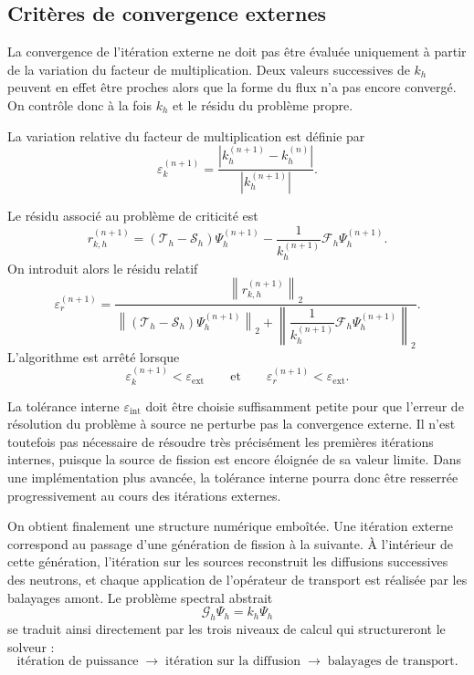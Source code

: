 \documentclass{article}
\begin{document}
\subsection {Critères de convergence externes}

La convergence de l'itération externe ne doit pas être évaluée uniquement à partir de la variation du facteur de multiplication. Deux valeurs successives de $k_h$ peuvent en effet être proches alors que la forme du flux n'a pas encore convergé. On contrôle donc à la fois $k_h$ et le résidu du problème propre.

La variation relative du facteur de multiplication est définie par
\begin{equation}
    \varepsilon_k^{(n+1)} =
    \frac{\left| k_h^{(n+1)}-k_h^{(n)} \right|}
    {\left|k_h^{(n+1)}\right|}.
    \label{eq:critere-keff-transport}
\end{equation}

Le résidu associé au problème de criticité est
\begin{equation}
    r_{k,h}^{(n+1)} = \left( \mathcal T_h-\mathcal S_h \right) \Psi_h^{(n+1)}
    - \frac{1}{k_h^{(n+1)}} \mathcal F_h\Psi_h^{(n+1)}.
    \label{eq:residu-criticite-transport}
\end{equation}
On introduit alors le résidu relatif
\begin{equation}
    \varepsilon_r^{(n+1)}
    = \frac{\left\| r_{k,h}^{(n+1)} \right\|_2}
    {\left\|
        \left( \mathcal T_h-\mathcal S_h \right) \Psi_h^{(n+1)} \right\|_2
        + \left\| \dfrac{1}{k_h^{(n+1)}} \mathcal F_h\Psi_h^{(n+1)} \right\|_2}.
    \label{eq:critere-residu-transport}
\end{equation}
L'algorithme est arrêté lorsque
\begin{equation}
    \boxed{
        \varepsilon_k^{(n+1)} < \varepsilon_{\mathrm{ext}}
        \qquad\text{et}\qquad
        \varepsilon_r^{(n+1)} < \varepsilon_{\mathrm{ext}}.
    }
    \label{eq:arret-criticite-transport}
\end{equation}

La tolérance interne $\varepsilon_{\mathrm{int}}$ doit être choisie suffisamment petite pour que l'erreur de résolution du problème à source ne perturbe pas la convergence externe. Il n'est toutefois pas nécessaire de résoudre très précisément les premières itérations internes, puisque la source de fission est encore éloignée de sa valeur limite. Dans une implémentation plus avancée, la tolérance interne pourra donc être resserrée progressivement au cours des itérations externes.

On obtient finalement une structure numérique emboîtée. Une itération externe correspond au passage d'une génération de fission à la suivante. À l'intérieur de cette génération, l'itération sur les
sources reconstruit les diffusions successives des neutrons, et chaque application de l'opérateur de transport est réalisée par les balayages amont. Le problème spectral abstrait
\[
    \mathcal G_h\Psi_h=k_h\Psi_h
\]
se traduit ainsi directement par les trois niveaux de calcul qui structureront le solveur :
\[
    \boxed{
        \text{itération de puissance}
        \;\longrightarrow\; \text{itération sur la diffusion}
        \;\longrightarrow\; \text{balayages de transport}.}
\]

\printbibliography
\end{document}
